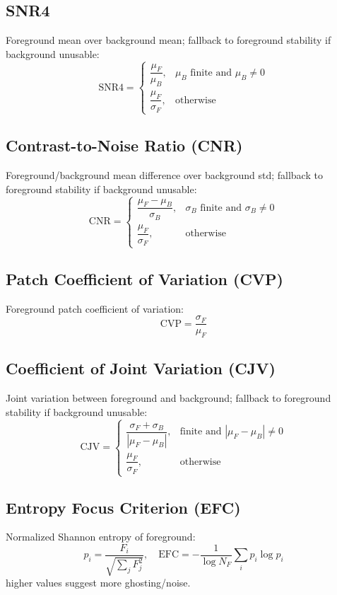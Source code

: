 \documentclass[11pt]{article}
\begin{document}
\subsection{SNR4}
Foreground mean over background mean; fallback to foreground stability if background unusable:
\[
\text{SNR4} =
\begin{cases}
\dfrac{\mu_F}{\mu_B}, & \mu_B \text{ finite and } \mu_B \neq 0\\[6pt]
\dfrac{\mu_F}{\sigma_F}, & \text{otherwise}
\end{cases}
\]

\subsection{Contrast-to-Noise Ratio (CNR)}
Foreground/background mean difference over background std; fallback to foreground stability if background unusable:
\[
\text{CNR} =
\begin{cases}
\dfrac{\mu_F - \mu_B}{\sigma_B}, & \sigma_B \text{ finite and } \sigma_B \neq 0\\[6pt]
\dfrac{\mu_F}{\sigma_F}, & \text{otherwise}
\end{cases}
\]

\subsection{Patch Coefficient of Variation (CVP)}
Foreground patch coefficient of variation:
\[
\text{CVP} = \frac{\sigma_F}{\mu_F}
\]

\subsection{Coefficient of Joint Variation (CJV)}
Joint variation between foreground and background; fallback to foreground stability if background unusable:
\[
\text{CJV} =
\begin{cases}
\dfrac{\sigma_F + \sigma_B}{|\mu_F - \mu_B|}, & \text{finite and } |\mu_F - \mu_B| \neq 0\\[6pt]
\dfrac{\mu_F}{\sigma_F}, & \text{otherwise}
\end{cases}
\]

\subsection{Entropy Focus Criterion (EFC)}
Normalized Shannon entropy of foreground:
\[
p_i = \frac{F_i}{\sqrt{\sum_j F_j^2}}, \quad
\text{EFC} = -\frac{1}{\log N_F} \sum_i p_i \log p_i
\]
higher values suggest more ghosting/noise.
\end{document}
